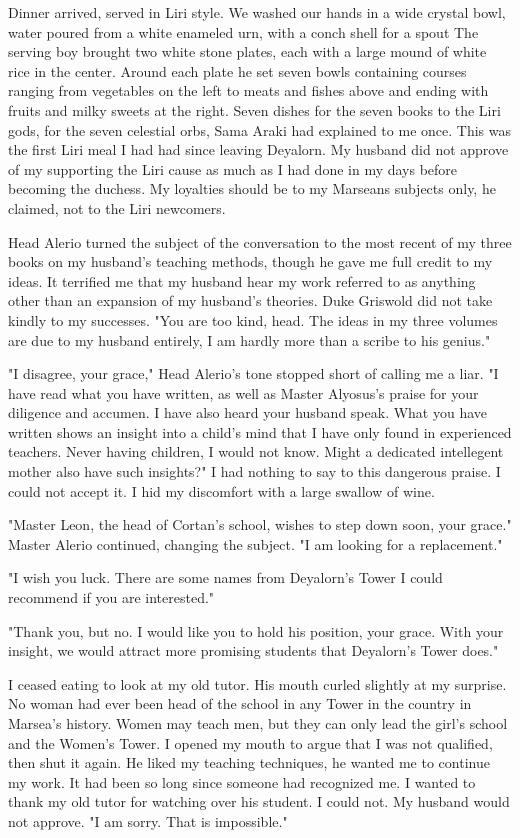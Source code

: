 \documentclass{article}
\begin{document}
Dinner arrived, served in Liri style. We washed our hands in a wide crystal bowl, water poured from a white enameled urn, with a conch shell for a spout The serving boy brought two white stone plates, each with a large mound of white rice in the center. Around each plate he set seven bowls containing courses ranging from vegetables on the left to meats and fishes above and ending with fruits and milky sweets at the right. Seven dishes for the seven books to the Liri gods, for the seven celestial orbs, Sama Araki had explained to me once. This was the first Liri meal I had had since leaving Deyalorn. My husband did not approve of my supporting the Liri cause as much as I had done in my days before becoming the duchess. My loyalties should be to my Marseans subjects only, he claimed, not to the Liri newcomers. 

Head Alerio turned the subject of the conversation to the most recent of my three books on my husband's teaching methods, though he gave me full credit to my ideas. It terrified me that my husband hear my work referred to as anything other than an expansion of my husband's theories. Duke Griswold did not take kindly to my successes. "You are too kind, head. The ideas in my three volumes are due to my husband entirely, I am hardly more than a scribe to his genius." 

"I disagree, your grace," Head Alerio's tone stopped short of calling me a liar. "I have read what you have written, as well as Master Alyosus's praise for your diligence and accumen. I have also heard your husband speak. What you have written shows an insight into a child's mind that I have only found in experienced teachers. Never having children, I would not know. Might a dedicated intellegent mother also have such insights?" I had nothing to say to this dangerous praise. I could not accept it. I hid my discomfort with a large swallow of wine. 
 
"Master Leon, the head of Cortan's school, wishes to step down soon, your grace." Master Alerio continued, changing the subject. "I am looking for a replacement."

"I wish you luck. There are some names from Deyalorn's Tower I could recommend if you are interested."

"Thank you, but no. I would like you to hold his position, your grace. With your insight, we would attract more promising students that Deyalorn's Tower does."

I ceased eating to look at my old tutor. His mouth curled slightly at my surprise. No woman had ever been head of the school in any Tower in the country in Marsea's history. Women may teach men, but they can only lead the girl's school and the Women's Tower. I opened my mouth to argue that I was not qualified, then shut it again. He liked my teaching techniques, he wanted me to continue my work. It had been so long since someone had recognized me. I wanted to thank my old tutor for watching over his student. I could not. My husband would not approve. "I am sorry. That is impossible."
\end{document}
